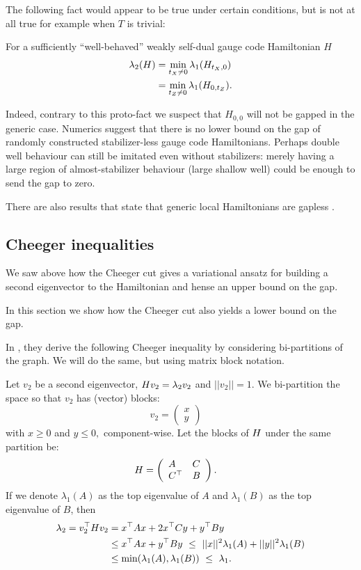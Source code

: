 The following fact would appear to be true under certain conditions,
but is not at all true for example when $T$ is trivial:
\begin{framed}
For a sufficiently ``well-behaved''
weakly self-dual
gauge code Hamiltonian $H$
\begin{align*}
\lambda_2(H) 
    &= \min_{t_X\ne 0} \lambda_1(H_{t_X,0})\\
    &= \min_{t_Z\ne 0} \lambda_1(H_{0,t_Z}).
\end{align*}
\end{framed}
Indeed, contrary to this proto-fact
we suspect that $H_{0,0}$ will not be gapped in
the generic case. 
Numerics suggest that
there is no lower bound on the gap of 
randomly constructed stabilizer-less gauge code Hamiltonians.
Perhaps double well behaviour can still be imitated even without
stabilizers: merely having a large region of almost-stabilizer
behaviour (large shallow well) could be enough to send the gap to zero.

There are also results that state that generic 
local Hamiltonians are gapless \cite{Movassagh2016}.

\subsection{Cheeger inequalities}

We saw above how the Cheeger cut gives a variational ansatz
for building a second eigenvector to the Hamiltonian and hense
an upper bound on the gap.

In this section we show how the Cheeger cut also 
yields a lower bound on the gap.

In \cite{Friedland2002}, they derive the following Cheeger inequality
by considering bi-partitions of the graph. We will do the
same, but using matrix block notation.

Let $v_2$ be a second eigenvector, $ H v_2 = \lambda_2 v_2 $ 
and $||v_2||=1$.
We bi-partition the space 
so that $v_2$ has (vector) blocks:
$$
v_2 = \left( \begin{array}{l}
x\\
y\end{array} \right)\quad
$$
with $x\ge 0$ and $y\le 0,$ component-wise.
Let the blocks of $H$ under the same partition be:
$$
H = \left( \begin{array}{ll}
A&C\\
C^\top&B\end{array} \right).\quad
$$
If we denote $\lambda_1(A)$ as the top eigenvalue of $A$ and
$\lambda_1(B)$ as the top eigenvalue of $B$,
then
\begin{align*}
\lambda_2 = v_2^\top H v_2 &= x^\top A x + 2 x^\top C y + y^\top B y \\
        &\le x^\top A x + y^\top B y\ \le\ ||x||^2 \lambda_1(A) + ||y||^2 \lambda_1(B) \\
        &\le \mbox{min}(\lambda_1(A), \lambda_1(B))\ \le\ \lambda_1.
\end{align*}

